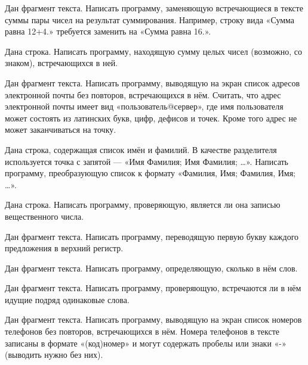 \task Дан фрагмент текста. Написать программу, заменяющую
встречающиеся в тексте суммы пары чисел на результат
суммирования. Например, строку вида «Сумма равна 12+4.» требуется
заменить на «Сумма равна 16.».

\task Дана строка. Написать программу, находящую сумму целых чисел
(возможно, со знаком), встречающихся в ней.

\task Дан фрагмент текста. Написать программу, выводящую на экран
список адресов электронной почты без повторов, встречающихся в
нём. Считать, что адрес электронной почты имеет вид
«пользователь@сервер», где имя пользователя может состоять из
латинских букв, цифр, дефисов и точек. Кроме того адрес не может
заканчиваться на точку.

\task Дана строка, содержащая список имён и фамилий. В качестве
разделителя используется точка с запятой — «Имя Фамилия; Имя Фамилия;
…». Написать программу, преобразующую список к формату «Фамилия, Имя;
Фамилия, Имя; …».

\task Дана строка. Написать программу, проверяющую, является ли она
записью вещественного числа.

\task Дан фрагмент текста. Написать программу, переводящую первую букву
каждого предложения в верхний регистр.

\task Дан фрагмент текста. Написать программу, определяющую, сколько в
нём слов.

\task Дан фрагмент текста. Написать программу, проверяющую,
встречаются ли в нём идущие подряд одинаковые слова.

\task Дан фрагмент текста. Написать программу, выводящую на экран
список номеров телефонов без повторов, встречающихся в нём. Номера
телефонов в тексте записаны в формате «(код)номер» и могут содержать
пробелы или знаки «-» (выводить нужно без них).
